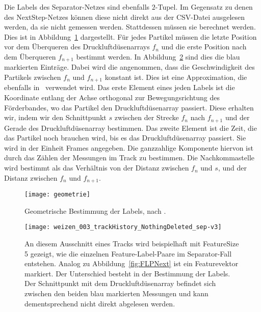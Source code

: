 Die Labels des Separator-Netzes sind ebenfalls \(2\)-Tupel.
Im Gegensatz zu denen des NextStep-Netzes können diese nicht direkt aus der CSV-Datei ausgelesen werden, da sie nicht gemessen werden.
Stattdessen müssen sie berechnet werden.
Dies ist in Abbildung~\ref{fig:Schnittpunkt} dargestellt.
Für jedes Partikel müssen die letzte Position vor dem Überqueren des Druckluftdüsenarrays \(f_n\) 
und die erste Position nach dem Überqueren \(f_{n+1}\) bestimmt werden.
In Abbildung~\ref{fig:FLPSep} sind dies die blau markierten Einträge. 
Dabei wird die angenommen, dass die Geschwindigkeit des Partikels zwischen \(f_n\) und \(f_{n+1}\) konstant ist.
Dies ist eine Approximation, die ebenfalls in~\cite{Pfaff2018} verwendet wird.
Das erste Element eines jeden Labels ist die Koordinate entlang der Achse orthogonal zur Bewegungsrichtung des Förderbandes, wo das Partikel den Druckluftdüsenarray passiert.
Diese erhalten wir, indem wir den Schnittpunkt \(s\) zwischen der Strecke \(f_n\) nach \(f_{n+1}\) und 
der Gerade des Druckluftdüsenarray bestimmen.
Das zweite Element ist die Zeit, die das Partikel noch brauchen wird, bis es das Druckluftdüsenarray passiert.
Sie wird in der Einheit Frames angegeben.
Die ganzzahlige Komponente hiervon ist durch das Zählen der Messungen im Track zu bestimmen.
Die Nachkommastelle wird bestimmt als das Verhältnis von der Distanz zwischen \(f_n\) und \(s\), 
und der Distanz zwischen \(f_n\) und \(f_{n+1}\).

\begin{figure}[h]
	\centering
	\texttt{[image: geometrie]}
	\caption{Geometrische Bestimmung der Labels, nach \cite{Pfaff2018}.}
	\label{fig:Schnittpunkt}
\end{figure}

\begin{figure}[h]
	\centering
	\texttt{[image: weizen\_003\_trackHistory\_NothingDeleted\_sep-v3]}
	\caption[Beispiel Feature-Label-Paar Separator]{An diesem Ausschnitt eines Tracks wird beispielhaft mit FeatureSize 5 gezeigt, wie die einzelnen Feature-Label-Paare im Separator-Fall entstehen.
	Analog zu Abbildung~\ref{fig:FLPNext} ist ein Featurevektor markiert. Der Unterschied besteht in der Bestimmung der Labels. 
	Der Schnittpunkt mit dem Druckluftdüsenarray befindet sich zwischen den beiden blau markierten Messungen und kann dementsprechend nicht direkt abgelesen werden.}
	\label{fig:FLPSep}
\end{figure}


